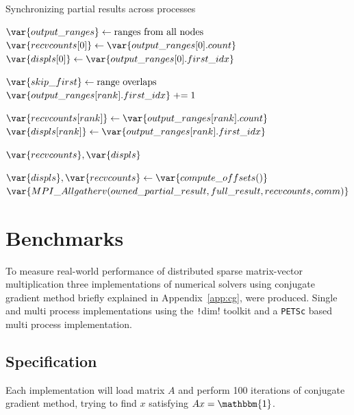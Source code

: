 \documentclass[thesis=M,english]{FITthesis}[2019/12/23]
\newcommand{\csre}[1]{\texttt!#1!}
\newcommand{\pluseq}{\mathrel{+}=}
\begin{document}
\begin{algorithm}[htp]
    \caption{Synchronizing partial results across processes}
    \begin{algorithmic}
        \State $\var{output\_ranges} \gets \text{ranges from all nodes}$
        \State $\var{recvcounts[0]} \gets \var{output\_ranges[0].count}$
        \State $\var{displs[0]} \gets \var{output\_ranges[0].first\_idx}$


        \State $\var{skip\_first} \gets \text{range overlaps}$
        \State $\var{output\_ranges[rank].first\_idx} \pluseq 1$
        \EndIf

        \State $\var{recvcounts[rank]} \gets \var{output\_ranges[rank].count}$
        \State $\var{displs[rank]} \gets \var{output\_ranges[rank].first\_idx}$

        \EndFor

        \Return $\var{recvcounts}, \var{displs}$

        \EndFunction

        \State $\var{displs}, \var{recvcounts} \gets \var{compute\_offsets()}$
        \State $\var{MPI\_Allgatherv(owned\_partial\_result, full\_result, recvcounts, comm)}$

        \EndFunction
    \end{algorithmic}
\end{algorithm}


\chapter{Benchmarks}

To measure real-world performance of distributed sparse matrix-vector multiplication
three implementations of numerical solvers using conjugate gradient method briefly explained in
Appendix~\ref{app:cg}, were produced.
Single and multi process implementations using the \csre{dim} toolkit
and a \texttt{PETSc} based multi process implementation.

\section{Specification}

Each implementation will load matrix $A$ and perform 100 iterations of conjugate
gradient method, trying to find $x$ satisfying $Ax=\mathbbm{1}$.
\end{document}
